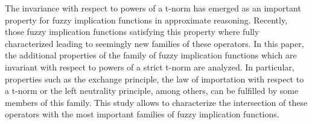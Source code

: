 
The invariance with respect to powers of a t-norm has emerged as an important property for fuzzy implication functions in approximate reasoning. Recently, those fuzzy implication functions satisfying this property where fully characterized leading to seemingly new families of these operators. In this paper, the additional properties of the family of fuzzy implication functions which are invariant with respect to powers of a strict t-norm are analyzed. In particular, properties such as the exchange principle, the law of importation with respect to a t-norm or the left neutrality principle, among others, can be fulfilled by some members of this family. This study allows to characterize the intersection of these operators with the most important families of fuzzy implication functions.  


